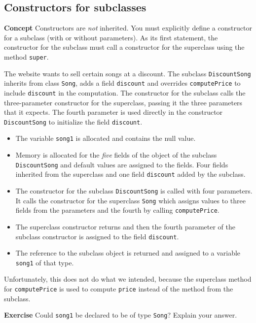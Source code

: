 \subsection{Constructors for subclasses}\label{con.06}

\textbf{Concept} Constructors are \emph{not} inherited. You must 
explicitly define a constructor for a subclass (with or without 
parameters). As its first statement, the constructor for the subclass must 
call a constructor for the superclass using the method \texttt{super}.


The website wants to sell certain songs at a discount.
The subclass \texttt{DiscountSong} inherits from class 
\texttt{Song}, adds a field \texttt{discount} and overrides 
\texttt{computePrice} to include \texttt{discount} in the computation. 
The constructor for the subclass calls the three-parameter constructor for 
the superclass, passing it the three parameters that it expects. The 
fourth parameter is used directly in the constructor \texttt{DiscountSong} 
to initialize the field \texttt{discount}.
\begin{itemize}
\item The variable \texttt{song1} is allocated and contains the null value.
\item Memory is allocated for the \emph{five} fields of the object of the subclass \texttt{DiscountSong} and default values are assigned to the fields. 
Four fields inherited from the superclass and one field \texttt{discount} 
added by the subclass.
\item The constructor for the subclass \texttt{DiscountSong} is called 
with four parameters. It calls the constructor for the superclass 
\texttt{Song} which assigns values to three fields from the parameters and 
the fourth by calling \texttt{computePrice}.
\item The superclass constructor returns and then the fourth parameter of 
the subclass constructor is assigned to the field \texttt{discount}.
\item The reference to the subclass object is returned and assigned to a 
variable \texttt{song1} of that type.
\end{itemize}
Unfortunately, this does not do what we intended, because the superclass 
method for \texttt{computePrice} is used to compute \texttt{price} 
instead of the method from the subclass.

\textbf{Exercise} Could \texttt{song1} be declared to be of type
\texttt{Song}? Explain your answer.

